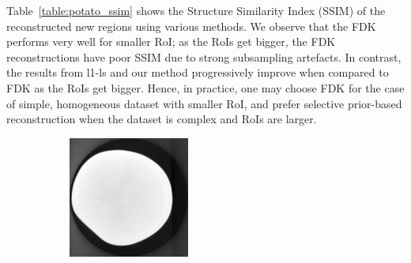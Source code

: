 \documentclass[journal]{IEEEtran}
\begin{document}
Table~\ref{table:potato_ssim} shows the Structure Similarity Index (SSIM) of the reconstructed new regions using various methods. We observe that the FDK performs very well for smaller RoI; as the RoIs get bigger, the FDK reconstructions have poor SSIM due to strong subsampling artefacts. In contrast, the results from l1-ls and our method progressively improve when compared to FDK as the RoIs get bigger. Hence, in practice, one may choose FDK for the case of simple, homogeneous dataset with smaller RoI,  and prefer selective prior-based reconstruction when the dataset is complex and RoIs are larger.
\begin{figure}[!h]
    \begin{subfigure}[b]{0.24\linewidth}
        \includegraphics[width=\textwidth]{../images/potato/template_1.png}
\captionsetup{labelformat=empty}       
 \caption{}
    \end{subfigure}
    \begin{subfigure}[b]{0.24\linewidth}

\end{subfigure}
\end{figure}
\end{document}
